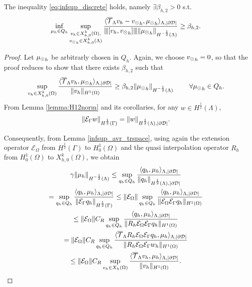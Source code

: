 \begin{theorem} The inequality \eqref{eq:infsup_discrete} holds, namely 
$\exists \beta_{h,2} >0$ s.t.
\begin{equation}
\inf_{\mu_h \in Q_h} 
\sup_{\substack{v_h \in X_{h,0}^k(\Omega),\\ {v_{\odot}}_h \in X_{h,0}^k(\Lambda)} }\frac{\langle {\overline{\mathcal{T}}_\Lambda} v_h -  {v_{\odot}}_h, {\mu_{\odot}}_h \rangle _{\Lambda,|\partial\mathcal{D}|} } {{\left\vert\kern-0.25ex\left\vert\kern-0.25ex\left\vert [v_h, {v_{\odot}}_h] \right\vert\kern-0.25ex\right\vert\kern-0.25ex\right\vert} \|{\mu_{\odot}}_h\|_{H^{-\frac 12 }(\Lambda)} } 
\geq \beta_{h,2}. 
\end{equation}
\end{theorem}
\begin{proof}
Let ${\mu_{\odot}}_h$ be arbitrarly chosen in $Q_h$. Again, we choose ${v_{\odot}}_h =0$, so that the proof reduces to show that there exists $\beta_{h,2}$ such that
\begin{equation*}
\sup_{v_h \in X_{h,0}^k(\Omega)} \frac{ \langle {\overline{\mathcal{T}}_\Lambda} v_h , {\mu_{\odot}}_h \rangle _{\Lambda,|\partial\mathcal{D}|} } {\|v_h\|_{H^1(\Omega)} }\geq \beta_{h,2} \|{\mu_{\odot}}_h\|_{H^{-\frac 12}(\Lambda)}\ \qquad \forall {\mu_{\odot}}_h \in Q_h.
\end{equation*}
From Lemma \ref{lemma:H12norm} and its corollaries, for any $w \in H^{\frac 12}(\Lambda)$,
\begin{equation*}
\|\mathcal{E}_\Gamma w\|_{H^{\frac 12}(\Gamma)}= \|w\|_{H^{\frac 12}(\Lambda),|\partial\mathcal{D}|}.
\end{equation*}

Consequently, from Lemma \ref{infsup_avr_trspace}, using again the extension operator $\mathcal{E}_{\Omega}$ from $H^{\frac 12}(\Gamma)$ to $H^1_0(\Omega)$ and the quasi interpolation operator $R_h$ from $H^1_0(\Omega)$ to $X_{h,0}^k(\Omega)$, we obtain
\begin{multline}
\gamma \|\mu_h\|_{H^{-\frac 12}(\Lambda)} \leq 
\sup_{q_h \in Q_h} \frac{ \langle q_h, \mu_h \rangle_{\Lambda,|\partial\mathcal{D}|} } {\|q_h\|_{H^{\frac 12}(\Lambda),|\partial\mathcal{D}|}} 
\\
=  \sup_{q_h \in Q_h} \frac{ \langle q_h, \mu_h \rangle _{\Lambda,|\partial\mathcal{D}|}} {\|\mathcal{E}_\Gamma q_h\|_{H^{\frac 12}(\Gamma)}} 
\leq \|\mathcal{E}_{\Omega}\| \sup_{q_h \in Q_h} \frac{ \langle q_h, \mu_h \rangle _{\Lambda,|\partial\mathcal{D}|} } {\|\mathcal{E}_{\Omega} \mathcal{E}_\Gamma q_h\|_{H^1(\Omega)}} 
\\
\leq \|\mathcal{E}_{\Omega}\| C_R \sup_{q_h \in Q_h} \frac{ \langle q_h, \mu_h \rangle _{\Lambda,|\partial\mathcal{D}|} } {\|R_h \mathcal{E}_{\Omega} \mathcal{E}_\Gamma q_h\|_{H^1(\Omega)}}
\\ 
=  \|\mathcal{E}_{\Omega}\| C_R \sup_{q_h \in Q_h} \frac{ \langle 	{\overline{\mathcal{T}}_\Lambda} R_h \mathcal{E}_{\Omega} \mathcal{E}_\Gamma q_h, \mu_h \rangle _{\Lambda,|\partial\mathcal{D}|}} {\|R_h \mathcal{E}_{\Omega} \mathcal{E}_\Gamma w_h\|_{H^1(\Omega)}}
\\
\leq \|\mathcal{E}_{\Omega}\| C_R \sup_{v_h \in X_h(\Omega)} \frac{ \langle {\overline{\mathcal{T}}_\Lambda} v_h, \mu_h \rangle _{\Lambda,|\partial\mathcal{D}|}} {\|v_h\|_{H^1(\Omega)}}. 
\end{multline}

\end{proof}